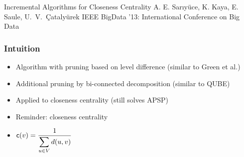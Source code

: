 \begin{frame}
  \centering
  \vfill
  {\huge Incremental Algorithms for Closeness Centrality}
  \vfill
  {\Large A. E. Sar\i y\"uce, K. Kaya, E. Saule, U.~V.~\c{C}ataly\"urek }
  \vfill
  {\large IEEE BigData '13: International Conference on Big Data}
  \vfill
\end{frame}


\begin{frame}
  \frametitle{Intuition}

  \begin{itemize}
    \item Algorithm with pruning based on level difference (similar to Green et al.)
    \item Additional pruning by bi-connected decomposition (similar to QUBE)
    \item Applied to closeness centrality (still solves APSP)
    \item Reminder: closeness centrality
    \item $\displaystyle \mathsf{c}(v)=\frac{1}{\displaystyle  \sum_{u \in V} d(u,v)}$
  \end{itemize}

\end{frame}


